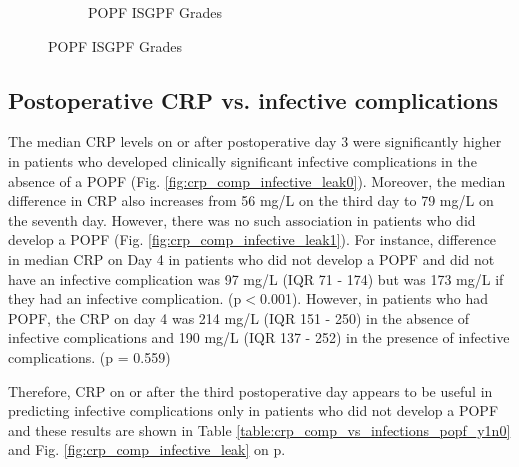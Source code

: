 \begin{figure}[t]
\begin{subfigure}{0.48\textwidth}
		\caption{POPF ISGPF Grades}
		\label{fig:crp_comp_crp_popf_isgps}
	\end{subfigure}
\end{figure}
\hfill

\clearpage

\subsection{Postoperative CRP vs. infective complications}
The median CRP levels on or after postoperative day 3 were significantly higher in patients who developed clinically significant infective complications in the absence of a POPF (Fig. \ref{fig:crp_comp_infective_leak0}). 
Moreover, the median difference in CRP also increases from 56 mg/L on the third day to 79 mg/L on the seventh day. 
However, there was no such association in patients who did develop a POPF (Fig. \ref{fig:crp_comp_infective_leak1}).  For instance, difference in median CRP on Day 4 in patients who did not develop a POPF and did not have an infective complication was 97 mg/L (IQR 71 - 174) but was 173 mg/L if they had an infective complication. (p$<$0.001). 
However, in patients who had POPF, the CRP on day 4 was 214 mg/L (IQR 151 - 250) in the absence of infective complications and 190 mg/L (IQR 137 - 252) in the presence of infective complications. (p = 0.559)

Therefore, CRP on or after the third postoperative day appears to be useful in predicting infective complications only in patients who did not develop a POPF and these results are shown in Table \ref{table:crp_comp_vs_infections_popf_y1n0} and Fig. \ref{fig:crp_comp_infective_leak} on p\pageref{fig:crp_comp_infective_leak}. 

